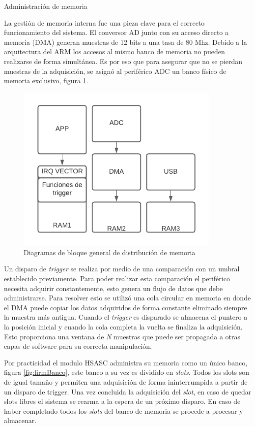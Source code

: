 \vspace{10mm}

Administración de memoria

La gestión de memoria interna fue una pieza clave para el correcto funcionamiento del sistema. El conversor AD junto con su acceso directo a memoria (DMA) generan muestras de 12 bits a una tasa de 80 Mhz. Debido a la arquitectura del ARM los accesos al mismo banco de memoria no pueden realizarse de forma simultánea. Es por eso que para asegurar que no se pierdan muestras de la adquisición, se asignó al periférico ADC un banco físico de memoria exclusivo, figura \ref{fig:firmMemoria}.

\begin{figure}[ht]
	\centering
	\includegraphics[width=100mm]{./Figures/firmMemoria.png}
	\caption{Diagramas de bloque general de distribución de memoria}
	\label{fig:firmMemoria}
\end{figure}

Un disparo de \textit{trigger} se realiza por medio de una comparación con un umbral establecido previamente. Para poder realizar esta comparación el periférico necesita adquirir constantemente, esto genera un flujo de datos que debe administrarse. Para resolver esto se utilizó una cola circular en memoria en donde el DMA puede copiar los datos adquiridos de forma constante eliminado siempre la muestra más antigua. Cuando el \textit{trigger} es disparado se almacena el puntero a la posición inicial y cuando la cola completa la vuelta se finaliza la adquisición. Esto proporciona una ventana de \textit{N} muestras que puede ser propagada a otras capas de software para su correcta manipulación. 

Por practicidad el modulo HSASC administra su memoria como un único banco, figura \ref{fig:firmBanco}, este banco a su vez es dividido en \textit{slots}. Todos los slots son de igual tamaño y permiten una adquisición de forma ininterrumpida a partir de un disparo de trigger. Una vez concluida la adquisición del \textit{slot},  en caso de quedar slots libres el sistema se rearma a la espera de un próximo disparo. En caso de haber completado todos los \textit{slots} del banco de memoria se procede a procesar y almacenar.

